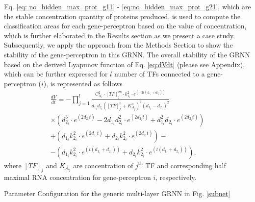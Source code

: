 \documentclass[twocolumn]{biophys-new}
\begin{document}
{{Eq. \ref{eq: no_hidden_max_prot_g11} - \ref{eq:no_hidden_max_prot_g21}, which are the stable concentration quantity of proteins produced, is used to compute the classification areas for each gene-perceptron based on the value of concentration, which is further elaborated in the Results section  as we present a case study.  Subsequently, we apply the approach from the Methods Section   to show the stability of the gene-perceptron in this GRNN. 
The overall stability of the GRNN %
based on the derived Lyapunov function of Eq. \ref{eq:dVdt} (please see Appendix), which can be further expressed for $l$ number of  TFs connected to a gene-perceptron ($i$), is represented as follows
\vspace{-0.5em}
\begin{multline} 
    \frac{dV}{dt} = - \prod_{j=1}^l \frac{C_{N_i}^2 \cdot [TF]_j^{2n} \cdot k_{1_i}^2 \cdot e^{(-2t(d_{1_i} + d_{2_i}))}}{d_{1_i}d_{2_i}([TF]_j^n + K_{A_j}^n)^2(d_{1_i} - d_{2_i})^2} \\
    \times (d_{2_i}^3 \cdot e^{(2d_{2_i}t)} - 2d_{1_i}d_{2_i}^2 \cdot e^{(2d_{2_i}t)} + d_{1_i}^2d_{2_i} \cdot e^{(2d_{2_i}t)}) \\
    + (d_{1_i}k_{2_i}^2 \cdot e^{(2d_{1_i}t)} + d_{2_i}k_{2_i}^2 \cdot e^{(2d_{2_i}t)}) - \\
    - (d_{1_i}k_{2_i}^2 \cdot e^{(t(d_{1_i} + d_{2_i}))} + d_{2_i}k_{2_i}^2 \cdot e^{(t(d_{1_i} + d_{2_i}))}), \label{eq:dVdt_no_hidden} 
\end{multline}
where $[TF]_j$ and $K_{A_j}$ are concentration of $j^{\text{th}}$ TF and   corresponding half maximal RNA concentration for gene-perceptron $i$, respectively. %
\begin{table}[ht!]
\caption{Parameter Configuration for the generic multi-layer GRNN in Fig. \ref{subnet}  }

\end{table}}}
\end{document}
